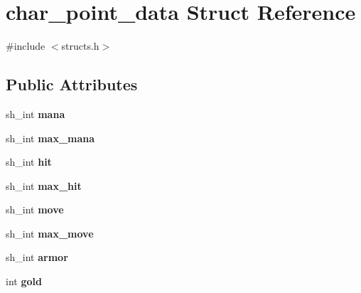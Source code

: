 \hypertarget{structchar__point__data}{}\section{char\+\_\+point\+\_\+data Struct Reference}
\label{structchar__point__data}


{\ttfamily \#include $<$structs.\+h$>$}

\subsection*{Public Attributes}
\begin{DoxyCompactItemize}
\item 
\mbox{\label{structchar__point__data_ad0114007b59d54691bf51f02a7e7a8e7}} 
sh\+\_\+int {\bfseries mana}
\item 
\mbox{\label{structchar__point__data_a3d1e0de4a4362f6b52970b884e4c9d9f}} 
sh\+\_\+int {\bfseries max\+\_\+mana}
\item 
\mbox{\label{structchar__point__data_a52e46db5f3ec39d6993173b52f1efefe}} 
sh\+\_\+int {\bfseries hit}
\item 
\mbox{\label{structchar__point__data_a03d100c9ad6c9a21d56b805a258a1e93}} 
sh\+\_\+int {\bfseries max\+\_\+hit}
\item 
\mbox{\label{structchar__point__data_a0d9aa4c34f15e4c248bc0086644f5a60}} 
sh\+\_\+int {\bfseries move}
\item 
\mbox{\label{structchar__point__data_a53f563f2ed8fe92e97f1674b01db6b0f}} 
sh\+\_\+int {\bfseries max\+\_\+move}
\item 
\mbox{\label{structchar__point__data_ad04a4f6b94ae95f2eb4305134806239b}} 
sh\+\_\+int {\bfseries armor}
\item 
\mbox{\label{structchar__point__data_a9c7938edaa159447bc7623d9bd5ccc20}} 
int {\bfseries gold}
\item 
\mbox{\label{structchar__point__data_a8248f1c95d1b6a084e4a1b274c5c5f6b}} 

\end{DoxyCompactItemize}
